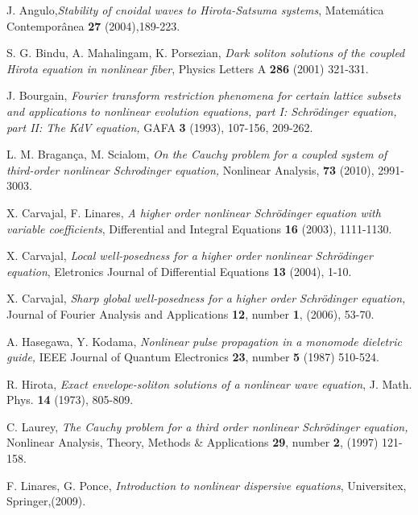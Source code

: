 \documentclass[reqno]{amsart}
\numberwithin{equation}{section}
\begin{document}
\begin{thebibliography}{99}

\small
                                                                                               
 J. Angulo,\textit{Stability of cnoidal waves to Hirota-Satsuma
systems}, Matem\'{a}tica Contempor\^{a}nea \textbf{27}
(2004),189-223.

S. G. Bindu, A. Mahalingam, K. Porsezian, \textit{Dark soliton
solutions of the coupled Hirota equation in nonlinear fiber},
Physics Letters A \textbf{286} (2001) 321-331.

 J. Bourgain, \textit{Fourier transform restriction phenomena for
certain lattice subsets and applications to nonlinear evolution
equations, part I: Schr\"{o}dinger equation, part II: The KdV
equation, }GAFA \textbf{3 }(1993), 107-156, 209-262.

 L. M. Bragan\c ca, M. Scialom, \textit{ On the Cauchy problem for
a coupled system of third-order nonlinear Schrodinger equation,}
Nonlinear Analysis, \textbf{73} (2010), 2991-3003.

 X. Carvajal, F. Linares, \textit{A higher order nonlinear
Schr\"{o}dinger equation with variable coefficients}, Differential
and Integral Equations \textbf{16} (2003), 1111-1130.

 X. Carvajal, \textit{Local well-posedness for a higher order
nonlinear Schr\"{o}dinger equation}, Eletronics Journal of
Differential Equations \textbf{13} (2004), 1-10.

 X. Carvajal, \textit{Sharp global well-posedness for a higher
order Schr\"{o}dinger equation, }Journal of Fourier Analysis and
Applications \textbf{12}, number \textbf{1}, (2006), 53-70.

 A. Hasegawa, Y. Kodama, \textit{Nonlinear pulse propagation in a
monomode dieletric guide, }IEEE Journal of Quantum Electronics
\textbf{23}, number \textbf{5} (1987) 510-524.

 R. Hirota, \textit{Exact envelope-soliton solutions of a
nonlinear wave equation}, J. Math. Phys. \textbf{14} (1973),
805-809.

 C. Laurey, \textit{The Cauchy problem for a third order nonlinear
Schr\"{o}dinger equation, }Nonlinear Analysis, Theory, Methods \&
Applications \textbf{29}, number \textbf{2}, (1997) 121-158.

 F. Linares, G. Ponce, \textit{Introduction to nonlinear
dispersive equations}, Universitex, Springer,(2009).


\end{thebibliography}
\end{document}

